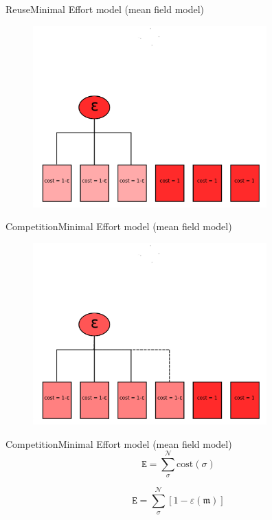 \documentclass[11pt,svgnames]{beamer}
\newcommand{\Ee}{\mathtt E}
\newcommand{\Enne}{\mathcal N}
\newcommand{\emme}{\mathfrak m}
\begin{document}
\begin{frame}[noframenumbering]{Reuse}{Minimal Effort model (mean field model)}
\begin{figure}[H]%
\includegraphics[width=9cm,draft=false]{immagini/bbb.pdf}
\end{figure}
\end{frame}

\begin{frame}[noframenumbering]{Competition}{Minimal Effort model (mean field model)}
\begin{figure}[H]%
\includegraphics[width=9cm,draft=false]{immagini/ccc.pdf}
\end{figure}
\end{frame}

\begin{frame}[t]{Competition}{Minimal Effort model (mean field model)}
\[ \Ee = \sum_{\sigma}^{\Enne} \text{cost}(\sigma) \]
\begin{tcolorbox}[colframe=green]
\[ \Ee = \sum_{\sigma}^{\Enne} \left[1 - \varepsilon(\emme) \right]\]
\end{tcolorbox}
\end{frame}
\end{document}
